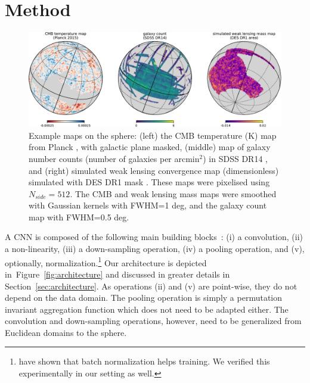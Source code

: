 \documentclass[final,twocolumn,3p,times,sort&compress]{elsarticle}
\newcommand{\figref}[1]{Figure~\ref{fig:#1}}
\newcommand{\secref}[1]{Section~\ref{sec:#1}}
\newcommand{\1}{\b{1}}              %
\newcommand{\0}{\b{0}}              %
\begin{document}
\section{Method}
\label{sec:method}

\begin{figure}
\includegraphics[width=\linewidth]{figure_example_maps}
\caption{Example maps on the sphere:
(left) the CMB temperature (K) map from Planck \citep{planck2015overview}, with galactic plane masked,
(middle) map of galaxy number counts (number of galaxies per arcmin$^2$) in SDSS DR14 \citep{abolfathi2017sdssDR14},
and (right) simulated weak lensing convergence map (dimensionless) simulated with DES DR1 mask \citep{des2018dr1}.
These maps were pixelised using $N_{side} = 512$.
The CMB and weak lensing mass maps were smoothed with Gaussian kernels with FWHM=1 deg, and the galaxy count map with FWHM=0.5 deg.
}
\label{fig:example_maps}
\end{figure}

A CNN is composed of the following main building blocks~\citep{lecun1998cnn}:
(i) a convolution,
(ii) a non-linearity,
(iii) a down-sampling operation,
(iv) a pooling operation, and
(v), optionally,  normalization.\footnote{\citep{ioffe2015batchnorm} have shown that batch normalization helps training. We verified this experimentally in our setting as well.}
Our architecture is depicted in~\figref{architecture} and discussed in greater details in \secref{architecture}. As operations (ii) and (v) are point-wise, they do not depend on the data domain. The pooling operation is simply a permutation invariant aggregation function which does not need to be adapted either. The convolution and down-sampling operations, however, need to be generalized from Euclidean domains to the sphere.
\end{document}
